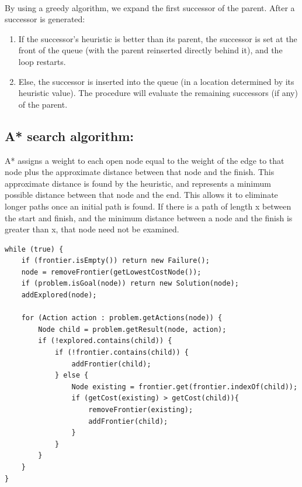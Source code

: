 \documentclass[a4paper]{article}
\begin{document}
\noindent \\
By using a greedy algorithm, we expand the first successor of the parent. After a successor is generated: \\
\begin{enumerate}
	\item If the successor's heuristic is better than its parent, the successor is set at the front of the queue (with the parent reinserted directly behind it), and the loop restarts.
	\item Else, the successor is inserted into the queue (in a location determined by its heuristic value). The procedure will evaluate the remaining successors (if any) of the parent.
\end{enumerate}


\subsection{A* search algorithm:}

A* assigns a weight to each open node equal to the weight of the edge to that node plus the approximate distance between that node and the finish. This approximate distance is found by the heuristic, and represents a minimum possible distance between that node and the end. This allows it to eliminate longer paths once an initial path is found. If there is a path of length x between the start and finish, and the minimum distance between a node and the finish is greater than x, that node need not be examined.

\begin{lstlisting}
while (true) {
    if (frontier.isEmpty()) return new Failure();
    node = removeFrontier(getLowestCostNode());
    if (problem.isGoal(node)) return new Solution(node);
    addExplored(node);

    for (Action action : problem.getActions(node)) {
        Node child = problem.getResult(node, action);
        if (!explored.contains(child)) {
            if (!frontier.contains(child)) {
                addFrontier(child);
            } else {
                Node existing = frontier.get(frontier.indexOf(child));
                if (getCost(existing) > getCost(child)){
                    removeFrontier(existing);
                    addFrontier(child);
                }
            }
        }
    }
}
\end{lstlisting}
\end{document}
